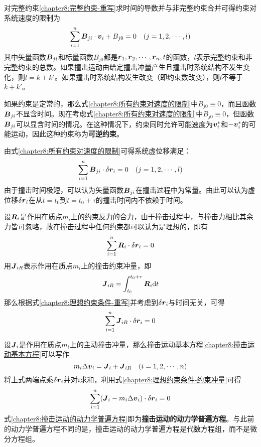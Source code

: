 对完整约束\eqref{chapter8:完整约束-重写}求时间的导数并与非完整约束合并可得约束对系统速度的限制为
\begin{equation}
	\sum_{i=1}^n \boldsymbol{B}_{ji}\cdot\boldsymbol{v}_i + B_{j0} = 0\quad (j=1,2,\cdots,l)
	\label{chapter8:所有约束对速度的限制}
\end{equation}
其中矢量函数$\boldsymbol{B}_{ji}$和标量函数$B_{j0}$都是$\boldsymbol{r}_1,\boldsymbol{r}_2,\cdots,\boldsymbol{r}_n,t$的函数，$l$表示完整约束和非完整约束的总数。如果撞击运动由给定撞击冲量产生且撞击时系统结构不发生变化，则$l=k+k'$。如果撞击时系统结构发生改变（即约束数改变），则$l$不等于$k+k'$。

如果约束是定常的，那么式\eqref{chapter8:所有约束对速度的限制}中$B_{j0}\equiv 0$，而且函数$\boldsymbol{B}_{ji}$不显含时间。现在考虑式\eqref{chapter8:所有约束对速度的限制}中$B_{j0}\equiv 0$，但函数$\boldsymbol{B}_{ji}$可以显含时间的情况。在这种情况下，约束同时允许可能速度为$\boldsymbol{v}_i^*$和$-\boldsymbol{v}_i^*$的可能运动，因此这种约束称为{\bf 可逆约束}。

由式\eqref{chapter8:所有约束对速度的限制}可得系统虚位移满足：
\begin{equation}
	\sum_{i=1}^n \boldsymbol{B}_{ji} \cdot \delta \boldsymbol{r}_i = 0\quad (j=1,2,\cdots,l)
	\label{chapter8:撞击运动中的虚位移}
\end{equation}
由于撞击时间极短，可以认为矢量函数$\boldsymbol{B}_{ji}$在撞击过程中为常量。由此可以认为虚位移$\delta\boldsymbol{r}_i$在从$t=t_0$到$t=t_0+\tau$的撞击时间内不依赖于时间。

设$\boldsymbol{R}_i$是作用在质点$m_i$上的约束反力的合力，由于撞击过程中，与撞击力相比其余力皆可忽略，故在撞击过程中任何约束都可以认为是理想的，即有
\begin{equation}
	\sum_{i=1}^n \boldsymbol{R}_i\cdot \delta \boldsymbol{r}_i = 0
	\label{chapter8:理想约束条件-重写}
\end{equation}
用$\boldsymbol{J}_{iR}$表示作用在质点$m_i$上的撞击约束冲量，即
\begin{equation}
	\boldsymbol{J}_{iR} = \int_{t_0}^{t_0+\tau}\boldsymbol{R}_i\mathrm{d} t
\end{equation}
那么根据式\eqref{chapter8:理想约束条件-重写}并考虑到$\delta\boldsymbol{r}_i$与时间无关，可得
\begin{equation}
	\sum_{i=1}^n \boldsymbol{J}_{iR} \cdot \delta\boldsymbol{r}_i = 0
	\label{chapter8:理想约束条件-约束冲量}
\end{equation}

设$\boldsymbol{J}_i$是作用在质点$m_i$上的主动撞击冲量，那么撞击运动基本方程\eqref{chapter8:撞击运动基本方程}可以写作
\begin{equation}
	m_i\Delta \boldsymbol{v}_i = \boldsymbol{J}_i + \boldsymbol{J}_{iR}\quad (i=1,2,\cdots,n)
\end{equation}
将上式两端点乘$\delta\boldsymbol{r}_i$并对$i$求和，利用式\eqref{chapter8:理想约束条件-约束冲量}可得
\begin{equation}
	\sum_{i=1}^n (\boldsymbol{J}_i - m_i\Delta\boldsymbol{v}_i) \cdot \delta\boldsymbol{r}_i = 0
	\label{chapter8:撞击运动的动力学普遍方程}
\end{equation}
式\eqref{chapter8:撞击运动的动力学普遍方程}即为{\bf 撞击运动的动力学普遍方程}。与此前的动力学普遍方程不同的是，撞击运动的动力学普遍方程是代数方程组，而不是微分方程组。

